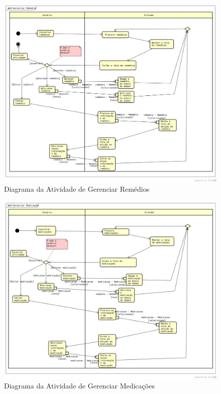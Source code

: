 \documentclass[12pt]{article}
\begin{document}
\begin{titlepage}
\begin{figure}[!h]
\begin{center}
\caption{Diagrama da Atividade de Gerenciar Remédios}
\includegraphics[width=6in]{img/atividaderemedio.png}

\end{center}
\end{figure}

\newpage

\begin{figure}[!h]
\begin{center}
\caption{Diagrama da Atividade de Gerenciar Medicações}
\includegraphics[width=6in]{img/atividademedicacao.png}


\end{center}
\end{figure}
\end{titlepage}
\end{document}
